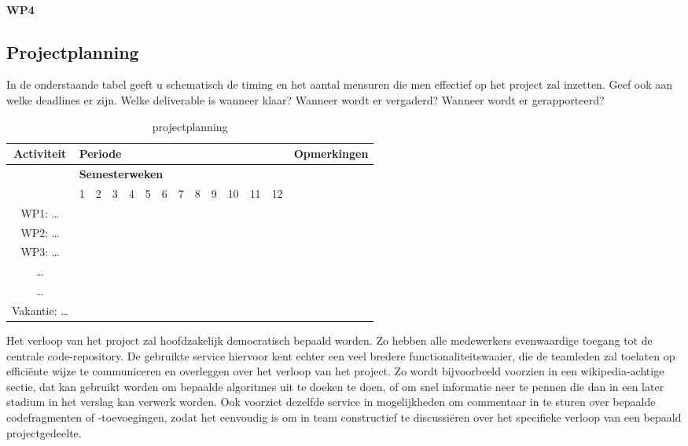 \documentclass[]{book}
\begin{document}
\paragraph{WP4}

\subsection{Projectplanning}\label{sec:Projectplanning}

In de onderstaande tabel geeft u schematisch de timing en het aantal mensuren die men effectief op het project zal inzetten. Geef ook aan welke deadlines er zijn. Welke deliverable is wanneer klaar? Wanneer wordt er vergaderd? Wanneer wordt er gerapporteerd?

\begin{table}[h]
	\centering
		\begin{tabular}{|*{14}{c|}}
		\hline
		\textbf{Activiteit} & \multicolumn{12}{l|}{\textbf{Periode}} & \textbf{Opmerkingen} \\
		\hline
							 & \multicolumn{12}{l|}{\textbf{Semesterweken}} &   \\
		\hline 
		  & 1	& 2	& 3	& 4	& 5	& 6	& 7	& 8	& 9	& 10 & 11	& 12 & \\
		\hline 
		WP1: \ldots & & & & & & & & & & & & & \\
		\hline 
		WP2: \ldots & & & & & & & & & & & & & \\
		\hline 
		WP3: \ldots & & & & & & & & & & & & & \\
		\hline 
		 \ldots & & & & & & & & & & & & & \\
		\hline 
		 \ldots & & & & & & & & & & & & & \\
		\hline 
		Vakantie: \ldots & & & & & & & & & & & & & \\
		\hline
		\end{tabular}
	\caption{projectplanning}
	\label{tab:projectplanning}
\end{table}
																							


Het verloop van het project zal hoofdzakelijk democratisch bepaald worden. Zo hebben alle medewerkers evenwaardige toegang tot de centrale code-repository. De gebruikte service hiervoor kent echter een veel bredere functionaliteitswaaier, die de teamleden zal toelaten op effici\"ente wijze te communiceren en overleggen over het verloop van het project. Zo wordt bijvoorbeeld voorzien in een wikipedia-achtige sectie, dat kan gebruikt worden om bepaalde algoritmes uit te doeken te doen, of om snel informatie neer te pennen die dan in een later stadium in het verslag kan verwerk worden. Ook voorziet dezelfde service in mogelijkheden om commentaar in te sturen over bepaalde codefragmenten of -toevoegingen, zodat het eenvoudig is om in team constructief te discussi\"eren over het specifieke verloop van een bepaald projectgedeelte.
\end{document}
